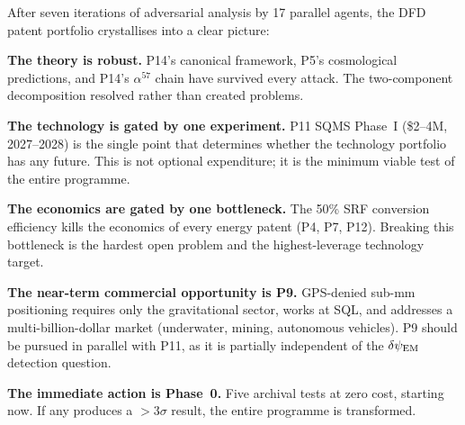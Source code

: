 \documentclass[11pt]{article}
\newcommand{\dpsiEM}{\delta\psi_{\rm EM}}
\begin{document}
After seven iterations of adversarial analysis by 17 parallel agents,
the DFD patent portfolio crystallises into a clear picture:

\textbf{The theory is robust.} P14's canonical framework, P5's
cosmological predictions, and P14's $\alpha^{57}$ chain have survived
every attack. The two-component decomposition resolved rather than
created problems.

\textbf{The technology is gated by one experiment.} P11 SQMS Phase~I
(\$2--4M, 2027--2028) is the single point that determines whether the
technology portfolio has any future. This is not optional expenditure;
it is the minimum viable test of the entire programme.

\textbf{The economics are gated by one bottleneck.} The 50\% SRF
conversion efficiency kills the economics of every energy patent (P4,
P7, P12). Breaking this bottleneck is the hardest open problem and
the highest-leverage technology target.

\textbf{The near-term commercial opportunity is P9.} GPS-denied
sub-mm positioning requires only the gravitational sector, works at
SQL, and addresses a multi-billion-dollar market (underwater, mining,
autonomous vehicles). P9 should be pursued in parallel with P11,
as it is partially independent of the $\dpsiEM$ detection question.

\textbf{The immediate action is Phase~0.} Five archival tests at zero
cost, starting now. If any produces a $>3\sigma$ result, the entire
programme is transformed.
\end{document}
